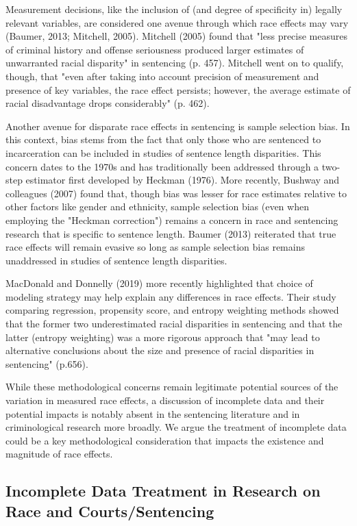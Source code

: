 \documentclass[titlepage]{article}
\begin{document}
Measurement decisions, like the inclusion of (and degree of specificity in) legally relevant variables, are considered one avenue through which race effects may vary (Baumer, 2013; Mitchell, 2005). Mitchell (2005) found that "less precise measures of criminal history and offense seriousness produced larger estimates of unwarranted racial disparity" in sentencing (p. 457). Mitchell went on to qualify, though, that "even after taking into account precision of measurement and presence of key variables, the race effect persists; however, the average estimate of racial disadvantage drops considerably" (p. 462).

Another avenue for disparate race effects in sentencing is sample selection bias. In this context, bias stems from the fact that only those who are sentenced to incarceration can be included in studies of sentence length disparities. This concern dates to the 1970s and has traditionally been addressed through a two-step estimator first developed by Heckman (1976). More recently, Bushway and colleagues (2007) found that, though bias was lesser for race estimates relative to other factors like gender and ethnicity, sample selection bias (even when employing the "Heckman correction") remains a concern in race and sentencing research that is specific to sentence length. Baumer (2013) reiterated that true race effects will remain evasive so long as sample selection bias remains unaddressed in studies of sentence length disparities.

MacDonald and Donnelly (2019) more recently highlighted that choice of modeling strategy may help explain any differences in race effects. Their study comparing regression, propensity score, and entropy weighting methods showed that the former two underestimated racial disparities in sentencing and that the latter (entropy weighting) was a more rigorous approach that "may lead to alternative conclusions about the size and presence of racial disparities in sentencing" (p.656). 

While these methodological concerns remain legitimate potential sources of the variation in measured race effects, a discussion of incomplete data and their potential impacts is notably absent in the sentencing literature and in criminological research more broadly. We argue the treatment of incomplete data could be a key methodological consideration that impacts the existence and magnitude of race effects. 

\subsection{Incomplete Data Treatment in Research on Race and Courts/Sentencing}
\end{document}
